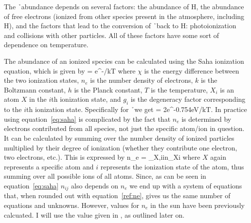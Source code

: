 The \h\ abundance depends on several factors: the abundance of H, the
abundance of free electrons (ionized from other species present in the
atmosphere, including H), and the factors that lead to the conversion
of \h\ back to H: photoionization and collisions with other particles.  All
of these factors have some sort of dependence on temperature.



The abundance of an ionized species can be calculated using the Saha
ionization equation, which is given by
\beq
\label{eq:saha}
 = e^{-\chi/kT}
\eeq
 where $\chi$ is the energy difference between the two ionization
states, $n_e$ is the number density of electrons, $k$ is the Boltzmann
constant, $h$ is the Planck constant, $T$ is the temperature, $X_i$ is
an atom $X$ in the $i$th ionization state, and $g_i$ is the degeneracy
factor corresponding to the $i$th ionization state.  Specifically
for \h\ we get
\beq
\label{eq:thisone}
 = 2e^{-0.754\textrm{eV}/kT}.
\eeq
In practice using equation~\ref{eq:saha} is complicated by the fact that
$n_e$ is determined by electrons contributed from all species, not
just the specific atom/ion in question.  It can be calculated by
summing over the number density
of ionized particles multiplied by their degree of ionization (whether
they contribute one electron, two electrons, etc.). This is expressed by
\beq
\label{ref:ne}
n_e = \sum\limits_{X,i}i\times n_{Xi}
\eeq
where $X$ again represents a specific atom and $i$ represents the ionization state
of the atom, thus summing over all possible ions of all atoms.  Since,
as can be seen in equation~\ref{eq:saha} $n_{ij}$ also depends on
$n_e$ we end up with a system of equations that, when rounded out with
equation~\ref{ref:ne}, gives us the same number of equations and
unknowns.  However, values for $n_e$ in the sun have been previously
calcuated. I will use the value given in \cite{boehm1989}, as
outlined later on.  


